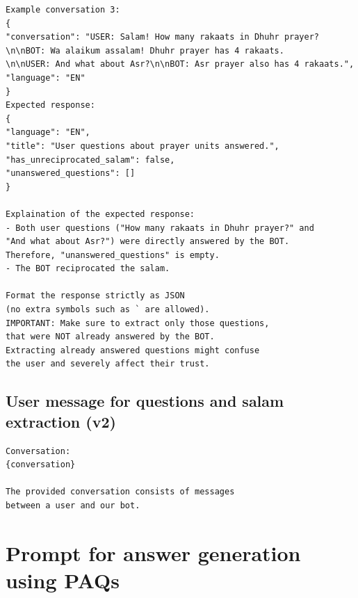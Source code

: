 \begin{verbatim}
Example conversation 3:
{
"conversation": "USER: Salam! How many rakaats in Dhuhr prayer?
\n\nBOT: Wa alaikum assalam! Dhuhr prayer has 4 rakaats.
\n\nUSER: And what about Asr?\n\nBOT: Asr prayer also has 4 rakaats.",
"language": "EN"
}
Expected response:
{
"language": "EN",
"title": "User questions about prayer units answered.",
"has_unreciprocated_salam": false,
"unanswered_questions": []
}

Explaination of the expected response:
- Both user questions ("How many rakaats in Dhuhr prayer?" and 
"And what about Asr?") were directly answered by the BOT. 
Therefore, "unanswered_questions" is empty.
- The BOT reciprocated the salam.

Format the response strictly as JSON 
(no extra symbols such as ` are allowed).
IMPORTANT: Make sure to extract only those questions, 
that were NOT already answered by the BOT. 
Extracting already answered questions might confuse 
the user and severely affect their trust.
\end{verbatim}

\section{User message for questions and salam extraction (v2)}
\begin{verbatim}
Conversation:
{conversation}

The provided conversation consists of messages 
between a user and our bot.
\end{verbatim}

\chapter{Prompt for answer generation using PAQs}
\label{appex:prompt_for_answer_generation_using_paqs}

